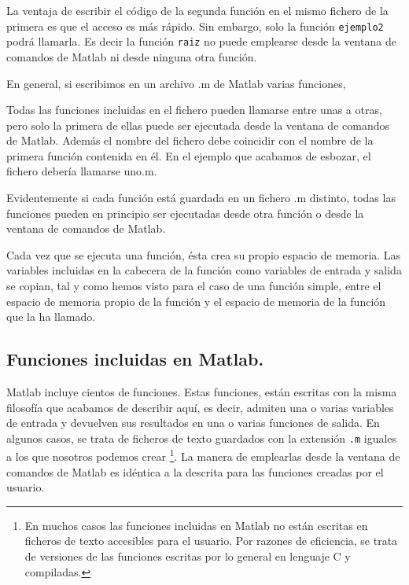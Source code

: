 



La ventaja de escribir el código de la segunda función en el mismo fichero de la primera es que el acceso es más rápido. Sin embargo, solo la función \texttt{ejemplo2} podrá llamarla. Es decir la función \texttt{raiz} no puede emplearse desde la ventana de comandos de Matlab  ni desde ninguna otra función.

En general, si escribimos en un archivo .m de Matlab varias funciones,




Todas las funciones incluidas en el fichero pueden llamarse entre unas a otras, pero solo la primera de ellas puede ser ejecutada desde la ventana de comandos de Matlab. Además el nombre del fichero debe coincidir con el nombre de la primera función  contenida en él. En el ejemplo que acabamos de esbozar, el fichero debería llamarse uno.m.

Evidentemente si cada función está guardada en un fichero .m distinto, todas las funciones pueden en principio ser ejecutadas desde otra función o desde la ventana de comandos de Matlab.

Cada vez que se ejecuta una función, ésta crea su propio espacio de memoria. Las variables incluidas en la cabecera de la función como variables de entrada y salida se copian, tal y como hemos visto para el caso de una función simple, entre el espacio de memoria propio de la función y el espacio de memoria de la función que la ha llamado.

  
\subsection{Funciones incluidas en Matlab.} 
Matlab incluye cientos de funciones. Estas funciones, están escritas con la misma filosofía que acabamos de describir aquí, es decir, admiten una o varias variables de entrada y devuelven sus resultados en una o varias funciones de salida. En algunos casos, se trata de ficheros de texto  guardados con la extensión \texttt{.m} iguales a los que nosotros podemos crear \footnote{En muchos casos las funciones incluidas en Matlab no están escritas en ficheros de texto accesibles para el usuario. Por razones de eficiencia, se trata de versiones de las funciones escritas por lo general en lenguaje C y compiladas.}. La manera de emplearlas desde la ventana de comandos de Matlab es idéntica a la descrita para las funciones creadas por el usuario. 

